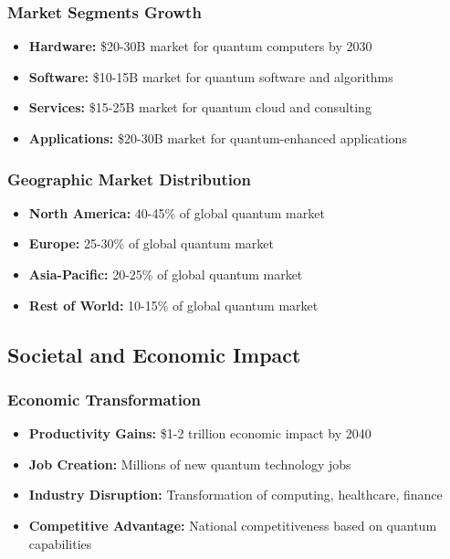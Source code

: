 \documentclass[12pt,a4paper]{article}
\begin{document}
\subsubsection{Market Segments Growth}
\begin{itemize}
    \item \textbf{Hardware:} \$20-30B market for quantum computers by 2030
    \item \textbf{Software:} \$10-15B market for quantum software and algorithms
    \item \textbf{Services:} \$15-25B market for quantum cloud and consulting
    \item \textbf{Applications:} \$20-30B market for quantum-enhanced applications
\end{itemize}

\subsubsection{Geographic Market Distribution}
\begin{itemize}
    \item \textbf{North America:} 40-45\% of global quantum market
    \item \textbf{Europe:} 25-30\% of global quantum market
    \item \textbf{Asia-Pacific:} 20-25\% of global quantum market
    \item \textbf{Rest of World:} 10-15\% of global quantum market
\end{itemize}

\subsection{Societal and Economic Impact}

\subsubsection{Economic Transformation}
\begin{itemize}
    \item \textbf{Productivity Gains:} \$1-2 trillion economic impact by 2040
    \item \textbf{Job Creation:} Millions of new quantum technology jobs
    \item \textbf{Industry Disruption:} Transformation of computing, healthcare, finance
    \item \textbf{Competitive Advantage:} National competitiveness based on quantum capabilities
\end{itemize}
\end{document}
